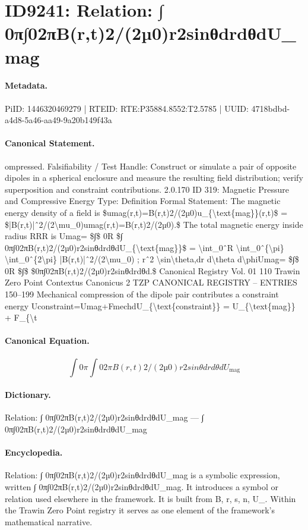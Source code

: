 \section*{ID9241: Relation: ∫ 0π∫02πB(r,t)2/(2µ0)r2sinθdrdθdU\_mag}
\paragraph{Metadata.}
PiID: 1446320469279 | RTEID: RTE:P35884.8552:T2.5785 | UUID: 4718bdbd-a4d8-5a46-aa49-9a20b149f43a

\paragraph{Canonical Statement.}
ompressed. Falsifiability / Test Handle: Construct or simulate a pair of opposite dipoles in a spherical enclosure and measure the resulting field distribution; verify superposition and constraint contributions. 2.0.170 ID 319: Magnetic Pressure and Compressive Energy Type: Definition Formal Statement: The magnetic energy density of a field is \$umag(r,t)=B(r,t)2/(2µ0)u\_\{\textbackslash{}text\{mag\}\}(r,t)\$ = \$|B(r,t)|ˆ2/(2\textbackslash{}mu\_0)umag(r,t)=B(r,t)2/(2µ0).\$ The total magnetic energy inside radius RRR is Umag= \$∫\$ 0R \$∫ 0π∫02πB(r,t)2/(2µ0)r2sinθdrdθdU\_\{\textbackslash{}text\{mag\}\}\$ = \textbackslash{}int\_0ˆR \textbackslash{}int\_0ˆ\{\textbackslash{}pi\} \textbackslash{}int\_0ˆ\{2\textbackslash{}pi\} |B(r,t)|ˆ2/(2\textbackslash{}mu\_0) ; rˆ2 \textbackslash{}sin\textbackslash{}theta,dr d\textbackslash{}theta d\textbackslash{}phiUmag= \$∫\$ 0R \$∫\$ \$0π∫02πB(r,t)2/(2µ0)r2sinθdrdθd.\$ Canonical Registry Vol. 01 110 Trawin Zero Point Contextus Canonicus 2 TZP CANONICAL REGISTRY – ENTRIES 150–199 Mechanical compression of the dipole pair contributes a constraint energy Uconstraint=Umag+FmechdU\_\{\textbackslash{}text\{constraint\}\} = U\_\{\textbackslash{}text\{mag\}\} + F\_\{\textbackslash{}t

\paragraph{Canonical Equation.}
\[
∫ 0π∫02πB(r,t)2/(2µ0)r2sinθdrdθdU_{\text{mag}}
\]

\paragraph{Dictionary.}
Relation: ∫ 0π∫02πB(r,t)2/(2µ0)r2sinθdrdθdU\_mag — ∫ 0π∫02πB(r,t)2/(2µ0)r2sinθdrdθdU\_mag

\paragraph{Encyclopedia.}
Relation: ∫ 0π∫02πB(r,t)2/(2µ0)r2sinθdrdθdU\_mag is a symbolic expression, written ∫ 0π∫02πB(r,t)2/(2µ0)r2sinθdrdθdU\_mag. It introduces a symbol or relation used elsewhere in the framework. It is built from B, r, s, n, U\_. Within the Trawin Zero Point registry it serves as one element of the framework's mathematical narrative.

